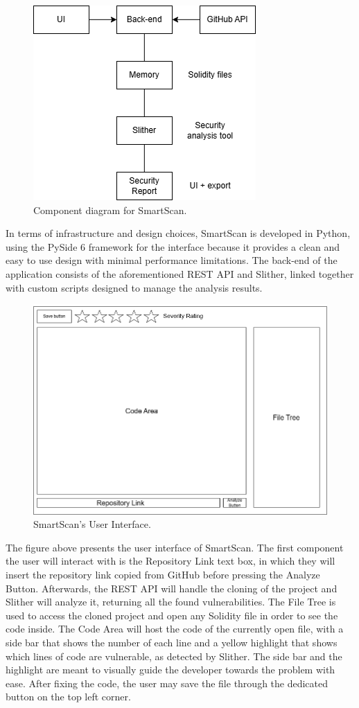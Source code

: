 \begin{figure}[h]
    \centering
    \includegraphics[width=0.5\linewidth]{images/component-diagram.png}
    \caption{Component diagram for SmartScan.}
    \label{fig:enter-label}
\end{figure}

In terms of infrastructure and design choices, SmartScan is developed in Python, using the PySide 6 framework \cite{pySide6} for the interface because it provides a clean and easy to use design with minimal performance limitations. The back-end of the application consists of the aforementioned REST API and Slither, linked together with custom scripts designed to manage the analysis results.

\begin{figure}[h]
    \centering
    \includegraphics[width=0.80\linewidth]{images/application-design.png}
    \caption{SmartScan's User Interface.}
    \label{fig:enter-label}
\end{figure}

The figure above presents the user interface of SmartScan. The first component the user will interact with is the Repository Link text box, in which they will insert the repository link copied from GitHub before pressing the Analyze Button. Afterwards, the REST API will handle the cloning of the project and Slither will analyze it, returning all the found vulnerabilities. The File Tree is used to access the cloned project and open any Solidity file in order to see the code inside. The Code Area will host the code of the currently open file, with a side bar that shows the number of each line and a yellow highlight that shows which lines of code are vulnerable, as detected by Slither. The side bar and the highlight are meant to visually guide the developer towards the problem with ease. After fixing the code, the user may save the file through the dedicated button on the top left corner.

